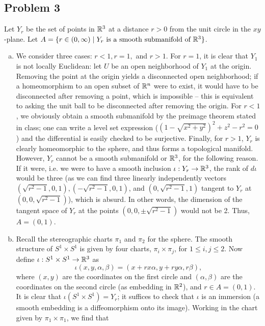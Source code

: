 \documentclass{../mathnotes}
\begin{document}
\subsection*{Problem 3}
Let $Y_r$ be the set of points in $\mathbb{R}^3$ at a distance $r>0$ from the unit circle in the $xy$-plane.
Let $A=\{r\in(0,\infty)\mid Y_r\text{ is a smooth submanifold of }\mathbb{R}^3\}$.
\begin{enumerate}[(a)]
    \item We consider three cases: $r<1, r=1,$ and $r>1$. For $r=1$, it is clear that $Y_1$ is not locally
        Euclidean: let $U$ be an open neighborhood of $Y_1$ at the origin. Removing the point at the origin
        yields a disconnected open neighborhood; if a homeomorphism to an open subset of $\mathbb{R}^n$ were to
        exist, it would have to be disconnected after removing a point, which is impossible -- this is equivalent
        to asking the unit ball to be disconnected after removing the origin. For
        $r<1$, we obviously obtain a smooth submanifold by the preimage theorem stated in class; one can
        write a level set expression ($(1-\sqrt{x^2+y^2})^2+z^2-r^2=0$) and the differential is easily
        checked to be surjective. Finally, for $r>1$, $Y_r$ is clearly homeomorphic to the sphere, and thus
        forms a topological manifold. However, $Y_r$ cannot be a smooth submanifold or $\mathbb{R}^3$, for the following
        reason. If it were, i.e. we were to have a smooth inclusion $\iota:Y_r\to\mathbb{R}^3$, the rank of $d\iota$
        would be three (as we can find three linearly independently vectors
        $(\sqrt{r^2-1},0,1),(-\sqrt{r^2-1},0,1)$, and $(0,\sqrt{r^2-1},1)$ tangent to $Y_r$ at $(0,0,\sqrt{r^2-1})$),
        which is absurd. In other words, the dimension of the tangent space of $Y_r$ at the points
        $(0,0,\pm\sqrt{r^2-1})$ would not be 2. Thus, $A=(0,1)$.
    \item Recall the stereographic charts $\pi_1$ and $\pi_2$ for the sphere. The smooth structure
        of $S^1\times S^1$ is given by four charts, $\pi_i\times\pi_j$, for $1\leq i,j\leq2$.
        Now define $\iota:S^1\times S^1\to\mathbb{R}^3$ as
        \[\iota(x,y,\alpha,\beta)=(x+rx\alpha,y+ry\alpha,r\beta),\]
        where $(x,y)$ are the coordinates on the first circle and $(\alpha,\beta)$ are the coordinates on
        the second circle (as embedding in $\mathbb{R}^2$), and $r\in A=(0,1)$. It is clear that $\iota(S^1\times S^1)=Y_r$;
        it suffices to check that $\iota$ is an immersion (a smooth embedding is a diffeomorphism onto its image).
        Working in the chart given by $\pi_1\times\pi_1$, we find that

\end{enumerate}
\end{document}
